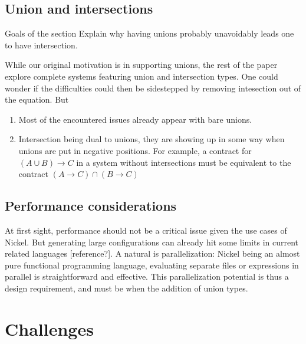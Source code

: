 \documentclass{article}
\newcommand{\info}[2][1=]{}
\begin{document}
\subsection{Union and intersections}
{\color{red}Goals of the section
Explain why having unions probably unavoidably leads one to have intersection.\vspace{0.5cm}}

While our original motivation is in supporting unions, the rest of the paper
explore complete systems featuring union and intersection types. One could
wonder if the difficulties could then be sidestepped by removing intesection out
of the equation. But

\begin{enumerate}
    \item Most of the encountered issues already appear with bare unions.
    \item Intersection being dual to unions, they are showing up in some way
        when unions are put in negative positions. For example, a contract for
        $(A \cup B) \to C$ in a system without intersections must be equivalent
        to the contract $(A \to C) \cap (B \to C)$
\end{enumerate}

\subsection{Performance considerations}
\info{This a draft}

At first sight, performance should not be a critical issue given the use cases
of Nickel. But generating large configurations can already hit some limits in
current related languages [reference?]. A natural is parallelization:
Nickel being an almost pure functional programming language, evaluating separate
files or expressions in parallel is straightforward and effective. This
parallelization potential is thus a design requirement, and must be when the
addition of union types.

\section{Challenges}


\printbibliography
\end{document}
